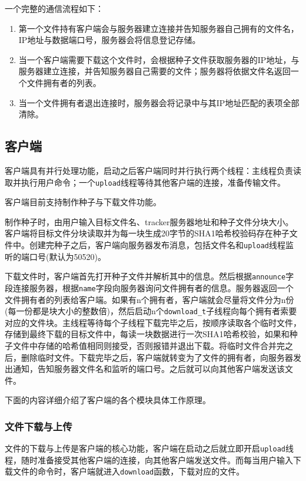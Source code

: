 \documentclass[thesis]{thesis}
\begin{document}
	一个完整的通信流程如下：
	\begin{enumerate}
		\item 第一个文件持有客户端会与服务器建立连接并告知服务器自己拥有的文件名，IP地址与数据端口号，服务器会将信息登记存储。
		\item 当一个客户端需要下载这个文件时，会根据种子文件获取服务器的IP地址，与服务器建立连接，并告知服务器自己需要的文件；服务器将依据文件名返回一个文件拥有者的列表。
		\item 当一个文件拥有者退出连接时，服务器会将记录中与其IP地址匹配的表项全部清除。
	\end{enumerate}

	\subsection{客户端}
	\label{sub:client}
	客户端具有并行处理功能，启动之后客户端同时并行执行两个线程：主线程负责读取并执行用户命令；一个\verb|upload|线程等待其他客户端的连接，准备传输文件。
	
	客户端目前支持制作种子与下载文件功能。
	
	制作种子时，由用户输入目标文件名、tracker服务器地址和种子文件分块大小。客户端将目标文件分块读取并为每一块生成20字节的SHA1哈希校验码存在种子文件中。创建完种子之后，客户端向服务器发布消息，包括文件名和\verb|upload|线程监听的端口号(默认为50520)。
	
	下载文件时，客户端首先打开种子文件并解析其中的信息。然后根据\verb|announce|字段连接服务器，根据\verb|name|字段向服务器询问文件拥有者的信息。服务器返回一个文件拥有者的列表给客户端。如果有n个拥有者，客户端就会尽量将文件分为n份(每一份都是块大小的整数倍)，然后启动n个\verb|download_t|子线程向每个拥有者索要对应的文件块。主线程等待每个子线程下载完毕之后，按顺序读取各个临时文件，存储到最终下载的目标文件中，每读一块数据进行一次SHA1哈希校验，如果和种子文件中存储的哈希值相同则接受，否则报错并退出下载。将临时文件合并完之后，删除临时文件。下载完毕之后，客户端就转变为了文件的拥有者，向服务器发出通知，告知服务器文件名和监听的端口号。之后就可以向其他客户端发送该文件。
	
	
	下面的内容详细介绍了客户端的各个模块具体工作原理。
	\subsubsection{文件下载与上传}
	文件的下载与上传是客户端的核心功能，客户端在启动之后就立即开启\verb|upload|线程，随时准备接受其他客户端的连接，向其他客户端发送文件。而每当用户输入下载文件的命令时，客户端就进入\verb|download|函数，下载对应的文件。
	
\end{document}
